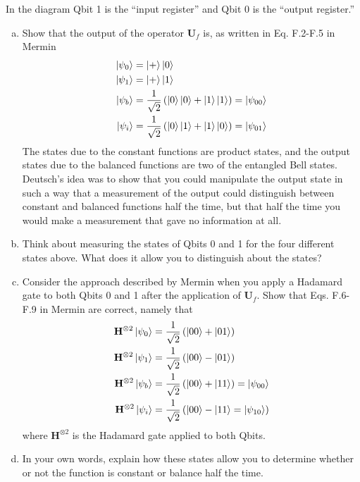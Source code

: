 \documentclass{book}
\theoremstyle{definition}
\newcommand{\nn}{\nonumber}
\newcommand{\f}[2]{\frac{#1}{#2}}
\newcommand{\lp}{\left(}
\newcommand{\rp}{\right)}
\newcommand{\had}{\mathbf{H}}
\begin{document}
\noindent In the diagram Qbit 1 is the ``input register'' and Qbit 0 is the ``output register.''

\begin{enumerate}[(a)]
	\item Show that the output of the operator $\mathbf{U}_f$ is, as written in Eq. F.2-F.5 in Mermin
	\begin{align*}
	\ket{\psi_0} &= \ket{+}\ket{0}\nn\\
	\ket{\psi_1} &= \ket{+}\ket{1}\nn\\
	\ket{\psi_b} &= \f{1}{\sqrt{2}}\lp \ket{0}\ket{0} + \ket{1}\ket{1} \rp = \ket{\psi_{00}}\nn\\
	\ket{\psi_i} &= \f{1}{\sqrt{2}}\lp \ket{0}\ket{1} + \ket{1}\ket{0} \rp = \ket{\psi_{01}}
	\end{align*}
	The states due to the constant functions are product states, and the output states due to the balanced functions are two of the entangled Bell states. Deutsch’s idea was to show that you could manipulate the output state in such a way that a measurement of the output could distinguish between constant and balanced functions half the time, but that half the time you would make a measurement that gave no information at all.
	
	\item Think about measuring the states of Qbits 0 and 1 for the four different states above. What does it allow you to distinguish about the states?
	
	
	\item Consider the approach described by Mermin when you apply a Hadamard gate to both Qbits 0 and 1 after the application of $\mathbf{U}_f$. Show that Eqs. F.6-F.9 in Mermin are correct, namely that
	\begin{align}
	\had^{\otimes 2}\ket{\psi_0} &= \f{1}{\sqrt{2}}\lp \ket{00} + \ket{01} \rp\nn\\
	\had^{\otimes 2}\ket{\psi_1} &= \f{1}{\sqrt{2}}\lp \ket{00} - \ket{01} \rp\nn\\
	\had^{\otimes 2}\ket{\psi_b} &= \f{1}{\sqrt{2}}\lp \ket{00} + \ket{11} \rp = \ket{\psi_{00}}\nn\\
	\had^{\otimes 2}\ket{\psi_i} &= \f{1}{\sqrt{2}}\lp \ket{00} - \ket{11} = \ket{\psi_{10}} \rp
	\end{align}
	where $\had^{\otimes 2}$ is the Hadamard gate applied to both Qbits. 
	
	
	\item In your own words, explain how these states allow you to determine whether or not the
	function is constant or balance half the time.
	

\end{enumerate}
\end{document}
